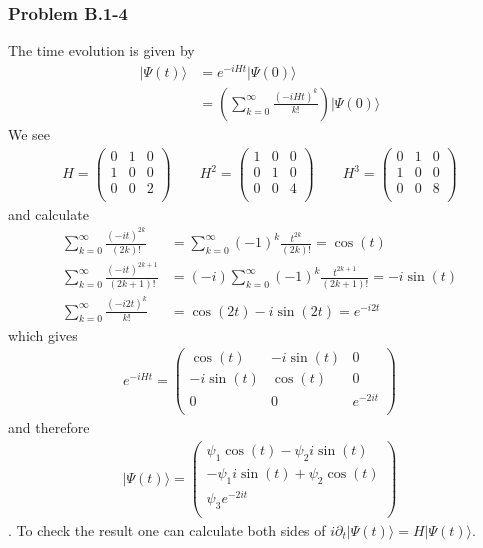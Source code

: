 \documentclass[10pt,a4paper]{book}
\theoremstyle{definition}
\begin{document}
\subsubsection{Problem B.1-4}
The time evolution is given by
\begin{align}
    |\Psi(t)\rangle&=e^{-iHt}|\Psi(0)\rangle\\
    &=\left(\sum_{k=0}^\infty\frac{(-iHt)^k}{k!}\right)|\Psi(0)\rangle
\end{align}
We see
\begin{align}
H=\left(
\begin{array}{ccc}
 0 & 1 & 0 \\
 1 & 0 & 0 \\
 0 & 0 & 2 \\
\end{array}
\right)\qquad
H^2=\left(
\begin{array}{ccc}
 1 & 0 & 0 \\
 0 & 1 & 0 \\
 0 & 0 & 4 \\
\end{array}
\right)
\qquad
H^3=\left(
\begin{array}{ccc}
 0 & 1 & 0 \\
 1 & 0 & 0 \\
 0 & 0 & 8 \\
\end{array}
\right)
\end{align}
and calculate
\begin{align}
    \sum_{k=0}^\infty\frac{(-it)^{2k}}{(2k)!}&=\sum_{k=0}^\infty(-1)^k \frac{t^{2k}}{(2k)!}=\cos(t)\\
    \sum_{k=0}^\infty\frac{(-it)^{2k+1}}{(2k+1)!}&=(-i)\sum_{k=0}^\infty(-1)^{k}\frac{t^{2k+1}}{(2k+1)!}=-i\sin(t)\\
    \sum_{k=0}^\infty\frac{(-i2t)^k}{k!}&=\cos(2t)-i\sin(2t)=e^{-i2t}
\end{align}
which gives
\begin{align}
    e^{-iHt}=\left(
\begin{array}{ccc}
 \cos (t) & -i \sin (t) & 0 \\
 -i \sin (t) & \cos (t) & 0 \\
 0 & 0 & e^{-2 i t} \\
\end{array}
\right)
\end{align}
and therefore
\begin{align}
|\Psi(t)\rangle=\left(
\begin{array}{ccc}
 \psi_1\cos (t)  -\psi_2i \sin (t) \\
 -\psi_1i \sin (t) + \psi_2\cos (t) \\
 \psi_3e^{-2 i t} \\
\end{array}
\right)
\end{align}.
To check the result one can calculate both sides of $i\partial_t|\Psi(t)\rangle=H|\Psi(t)\rangle$.
\end{document}
